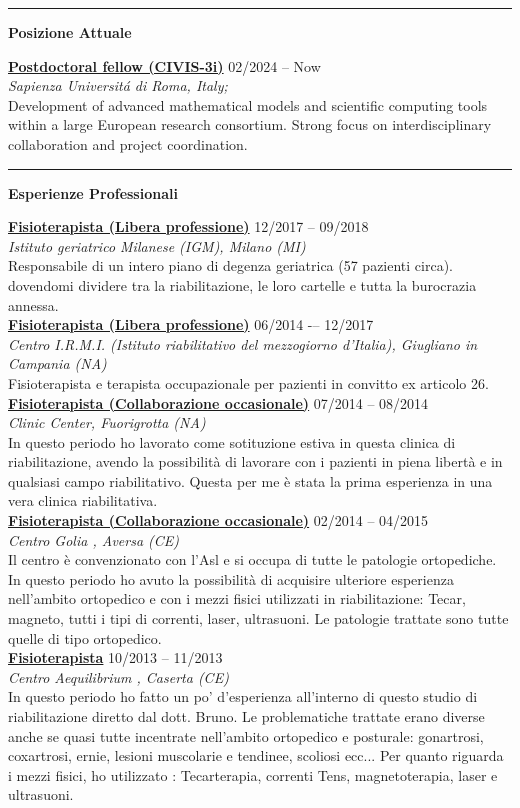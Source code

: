 \documentclass[a4paper]{article}
\newcommand{\block}[1]{\hrule \vspace{0.2cm} \textbf{\Large #1} \vspace{0.2cm}}
\newcommand{\voice}[5]{\href{#4}{\textbf{#1}} \hfill #2 \\ \textit{#3} \\ {\small #5} \vspace{0.2cm} \\}
\begin{document}
\begin{minipage}[t]{0.6\columnwidth}

	\block{Posizione Attuale}

    	\voice{Postdoctoral fellow (CIVIS-3i)}
			{02/2024 -- Now}
			{Sapienza Universit\'a di Roma, Italy;}
			{https://civis3i.univ-amu.fr/en/civis3i-alliance-programme}       
			{Development of advanced mathematical models and scientific computing tools within a large European research consortium. Strong focus on interdisciplinary collaboration and project coordination.}

    \block{Esperienze Professionali}

    \voice{Fisioterapista (Libera professione)}
    {12/2017 -- 09/2018}
    {Istituto geriatrico Milanese (IGM), Milano (MI)}
    {}
    {Responsabile di un intero piano di degenza geriatrica (57 pazienti circa). dovendomi dividere tra la riabilitazione, le loro cartelle e tutta la burocrazia annessa.}
    \voice{Fisioterapista (Libera professione)}
    {06/2014 -– 12/2017}
    {Centro I.R.M.I. (Istituto riabilitativo del mezzogiorno d'Italia), Giugliano in Campania (NA)}
    {}
    {Fisioterapista e terapista occupazionale per pazienti in convitto ex articolo 26.}
    \voice{Fisioterapista (Collaborazione occasionale)}
    {07/2014 -- 08/2014}
    {Clinic Center, Fuorigrotta (NA)}
    {}
    {In questo periodo ho lavorato come sotituzione estiva in questa clinica di riabilitazione,
avendo la possibilità di lavorare con i pazienti in piena libertà e in qualsiasi campo riabilitativo.
Questa per  me è stata la prima esperienza in una vera clinica riabilitativa.}
    \voice{Fisioterapista (Collaborazione occasionale)}
    {02/2014 -- 04/2015}
    {Centro Golia , Aversa (CE)}
    {}
    {Il centro è convenzionato con l'Asl e si occupa di tutte le patologie ortopediche.
    In questo periodo ho avuto la possibilità di acquisire ulteriore esperienza nell'ambito ortopedico e con i  mezzi fisici utilizzati in riabilitazione: Tecar, magneto, tutti i tipi di correnti, laser, ultrasuoni.
    Le patologie trattate sono tutte quelle di tipo ortopedico.}
    \voice{Fisioterapista}
    {10/2013 -- 11/2013}
    {Centro Aequilibrium , Caserta (CE)}
    {}
    {In questo periodo ho fatto un po' d'esperienza all'interno di questo studio di riabilitazione diretto dal dott. Bruno. Le problematiche trattate erano diverse anche se quasi tutte incentrate nell'ambito ortopedico e posturale:  gonartrosi, coxartrosi, ernie, lesioni muscolarie  e tendinee, scoliosi ecc...
Per quanto riguarda i mezzi fisici, ho utilizzato : Tecarterapia, correnti Tens, magnetoterapia, laser e ultrasuoni.\vspace{-0.25cm}}
 


\end{minipage}
\end{document}
